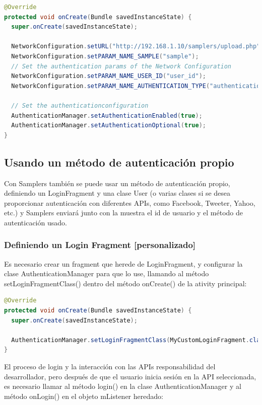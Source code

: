 \begin{lstlisting}[language=Java, frame=tlb]	
@Override
protected void onCreate(Bundle savedInstanceState) {
  super.onCreate(savedInstanceState);
	
  NetworkConfiguration.setURL("http://192.168.1.10/samplers/upload.php");
  NetworkConfiguration.setPARAM_NAME_SAMPLE("sample");
  // Set the authentication params of the Network Configuration
  NetworkConfiguration.setPARAM_NAME_USER_ID("user_id");
  NetworkConfiguration.setPARAM_NAME_AUTHENTICATION_TYPE("authentication_type");

  // Set the authenticationconfiguration
  AuthenticationManager.setAuthenticationEnabled(true);
  AuthenticationManager.setAuthenticationOptional(true);
}
\end{lstlisting}

\subsection{Usando un método de autenticación propio}

Con Samplers también se puede usar un método de autenticación propio, definiendo un LoginFragment y una clase User (o varias clases si se desea proporcionar autenticación con diferentes APIs, como Facebook, Tweeter, Yahoo, etc.) y Samplers enviará junto con la muestra el id de usuario y el método de autenticación usado.


\subsubsection{Definiendo un Login Fragment [personalizado]}

Es necesario crear un fragment que herede de LoginFragment, y configurar la clase AuthenticationManager para que lo use, llamando al método setLoginFragmentClass() dentro del método onCreate() de la ativity principal:

\begin{lstlisting}[language=Java, frame=tlb]	
@Override
protected void onCreate(Bundle savedInstanceState) {
  super.onCreate(savedInstanceState);
	
  AuthenticationManager.setLoginFragmentClass(MyCustomLoginFragment.class);
}
\end{lstlisting}

El proceso de login y la interacción con las APIs responsabilidad del desarrollador, pero después de que el usuario inicia sesión en la API seleccionada, es necesario llamar al método login() en la clase AuthenticationManager y al método onLogin() en el objeto mListener heredado:

